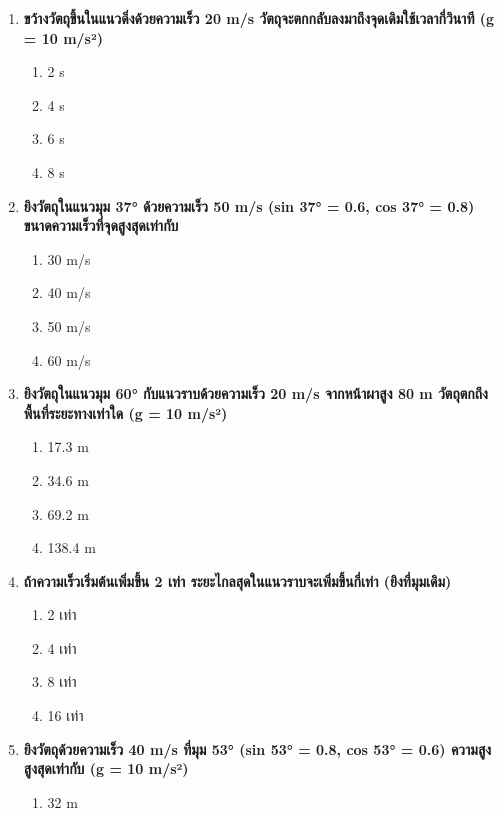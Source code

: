 \documentclass[12pt]{article}
\begin{document}
\begin{enumerate}
\begin{enumerate}[label=\alph*)]
\item 25 m
\item 31.25 m
\item 50 m
\item 62.5 m
\end{enumerate}
\item \textbf{ขว้างวัตถุขึ้นในแนวดิ่งด้วยความเร็ว 20 m/s วัตถุจะตกกลับลงมาถึงจุดเดิมใช้เวลากี่วินาที (g = 10 m/s²)}
\begin{enumerate}[label=\alph*)]
\item 2 s
\item 4 s
\item 6 s
\item 8 s
\end{enumerate}
\item \textbf{ยิงวัตถุในแนวมุม 37° ด้วยความเร็ว 50 m/s (sin 37° = 0.6, cos 37° = 0.8) ขนาดความเร็วที่จุดสูงสุดเท่ากับ}
\begin{enumerate}[label=\alph*)]
\item 30 m/s
\item 40 m/s
\item 50 m/s
\item 60 m/s
\end{enumerate}
\item \textbf{ยิงวัตถุในแนวมุม 60° กับแนวราบด้วยความเร็ว 20 m/s จากหน้าผาสูง 80 m วัตถุตกถึงพื้นที่ระยะทางเท่าใด (g = 10 m/s²)}
\begin{enumerate}[label=\alph*)]
\item 17.3 m
\item 34.6 m
\item 69.2 m
\item 138.4 m
\end{enumerate}
\item \textbf{ถ้าความเร็วเริ่มต้นเพิ่มขึ้น 2 เท่า ระยะไกลสุดในแนวราบจะเพิ่มขึ้นกี่เท่า (ยิงที่มุมเดิม)}
\begin{enumerate}[label=\alph*)]
\item 2 เท่า
\item 4 เท่า
\item 8 เท่า
\item 16 เท่า
\end{enumerate}
\item \textbf{ยิงวัตถุด้วยความเร็ว 40 m/s ที่มุม 53° (sin 53° = 0.8, cos 53° = 0.6) ความสูงสูงสุดเท่ากับ (g = 10 m/s²)}
\begin{enumerate}[label=\alph*)]
\item 32 m

\end{enumerate}
\end{enumerate}
\end{document}
